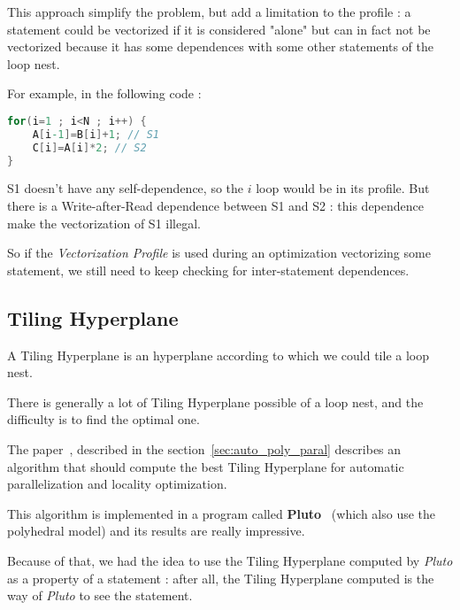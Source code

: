 \documentclass[paper=a4, fontsize=11.5pt]{scrartcl}
\numberwithin{equation}{section}        %
\numberwithin{figure}{section}          %
\numberwithin{table}{section}               %
\begin{document}
        This approach simplify the problem, but add a limitation to the profile :
        a statement could be vectorized if it is considered "alone" but can in fact not
        be vectorized because it has some dependences with some other statements of the loop
        nest.

        For example, in the following code :
\begin{lstlisting}[frame=single, language=C, caption={Vectorization Profile limitation example}, label={lst:vectorization_limitation}]
for(i=1 ; i<N ; i++) {
    A[i-1]=B[i]+1; // S1
    C[i]=A[i]*2; // S2
}
\end{lstlisting}
    S1 doesn't have any \gls{self-dependence}, so the $i$ loop would be in its
    profile. But there is a Write-after-Read dependence between S1 and S2 : this dependence
    make the vectorization of S1 illegal.

    So if the \textit{Vectorization Profile} is used during an optimization vectorizing
    some statement, we still need to keep checking for inter-statement dependences.


    \subsection{Tiling Hyperplane}
        A Tiling Hyperplane is an hyperplane according to which we could tile a loop nest.
        
        There is generally a lot of Tiling Hyperplane possible of a loop nest, and the difficulty
        is to find the optimal one.

        The paper~\cite{Bondhugula:2008:PAP:1379022.1375595}, described in the section~\ref{sec:auto_poly_paral}
        describes an algorithm that should compute the best Tiling Hyperplane for automatic
        parallelization and locality optimization.

        This algorithm is implemented in a program called \textbf{Pluto}~\cite{pluto} (which also
        use the polyhedral model) and its results are really impressive.

        Because of that, we had the idea to use the Tiling Hyperplane computed by \textit{Pluto}
        as a property of a statement : after all, the Tiling Hyperplane computed is the way
        of \textit{Pluto} to see the statement.
\end{document}
